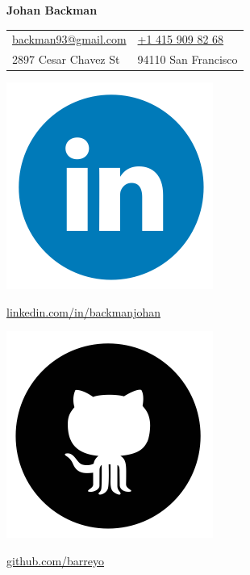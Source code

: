 \documentclass{cv_doc}
\begin{document}
\textbf{{\sffamily\huge Johan Backman}} \\

\begin{tabular}{@{}l l }
 \href{mailto:backman93@gmail.com}{backman93@gmail.com} & \href{tel:14159098268}{+1 415 909 82 68} \\
 2897 Cesar Chavez St & 94110 San Francisco \\
\end{tabular}

\vspace{0.12cm}

\begin{minipage}[c]{0.03\textwidth}
\includegraphics[scale=0.04]{linkedin}
\end{minipage}
\begin{minipage}[c]{0.25\textwidth}
{\small \href{https://linkedin.com/in/backmanjohan}{linkedin.com/in/backmanjohan}}
\end{minipage}

\begin{minipage}[c]{0.03\textwidth}
\includegraphics[scale=0.04]{github}
\end{minipage}
\begin{minipage}[c]{0.25\textwidth}
{\small \href{https://github.com/barreyo}{github.com/barreyo}}
\end{minipage}
\end{document}
